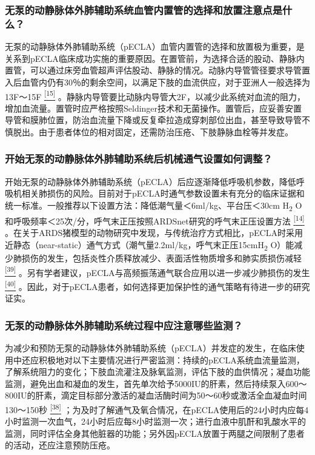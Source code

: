 \subsubsection{无泵的动静脉体外肺辅助系统血管内置管的选择和放置注意点是什么？}

无泵的动静脉体外肺辅助系统（pECLA）血管内置管的选择和放置极为重要，是关系到pECLA临床成功实施的重要原因。在置管前，为选择合适的股动、静脉内置管，可以通过床旁血管超声评估股动、静脉的情况。动脉内导管管径要求导管置入后血管内仍有30％的剩余空间，以满足下肢的血流供应，对于亚洲人一般选择为13F～15F
\protect\hyperlink{text00030.htmlux5cux23ch15-29}{\textsuperscript{{[}15{]}}}
。静脉内导管要比动脉内导管大2F，以减少此系统对血流的阻力，增加血流量。置管时应严格按照Seldinger技术和无菌操作。置管后，应妥善安置导管和膜肺位置，防治血流量下降或反复牵拉造成穿刺部位出血，甚至导致导管不慎脱出。由于患者体位的相对固定，还需防治压疮、下肢静脉血栓等并发症。

\subsubsection{开始无泵的动静脉体外肺辅助系统后机械通气设置如何调整？}

开始无泵的动静脉体外肺辅助系统（pECLA）后应逐渐降低呼吸机参数，降低呼吸机相关肺损伤的风险。目前对于pECLA时通气参数设置未有充分的临床证据和统一标准。一般推荐以下设置方法：降低潮气量＜6ml/kg、平台压＜30cm
H\textsubscript{2}
O和呼吸频率＜25次/分，呼气末正压按照ARDSnet研究的呼气末正压设置方法
\protect\hyperlink{text00030.htmlux5cux23ch14-29}{\textsuperscript{{[}14{]}}}
。在关于ARDS猪模型的动物研究中发现，与传统治疗方式相比，pECLA时采用近静态（near-static）通气方式（潮气量2.2ml/kg，呼气末正压15cmH\textsubscript{2}
O）能减少肺损伤的发生，包括炎性介质释放减少、表面活性物质增多和肺实质损伤减轻
\protect\hyperlink{text00030.htmlux5cux23ch39-29}{\textsuperscript{{[}39{]}}}
。另有学者建议，pECLA与高频振荡通气联合应用以进一步减少肺损伤的发生
\protect\hyperlink{text00030.htmlux5cux23ch40-29}{\textsuperscript{{[}40{]}}}
。因此，对于pECLA患者，如何选择更加保护性的通气策略有待进一步的研究证实。

\subsubsection{无泵的动静脉体外肺辅助系统过程中应注意哪些监测？}

为减少和预防无泵的动静脉体外肺辅助系统（pECLA）并发症的发生，在临床使用中还应积极地对以下主要情况进行严密监测：持续的pECLA系统血流量监测，了解系统阻力的变化；下肢血流灌注及脉氧监测，评估下肢的血供情况；凝血功能监测，避免出血和凝血的发生，首先单次给予5000IU的肝素，然后持续泵入600～800IU的肝素，滴定目标部分激活的凝血活酶时间为50～60秒或激活全血凝血时间130～150秒
\protect\hyperlink{text00030.htmlux5cux23ch38-29}{\textsuperscript{{[}38{]}}}
；为及时了解通气及氧合情况，在pECLA使用后的24小时内应每4小时监测一次血气，24小时后应每8小时监测一次；进行血液中肌酐和乳酸水平的监测，同时评估全身其他脏器的功能；另外因pECLA放置于两腿之间限制了患者的活动，还应注意预防压疮。

